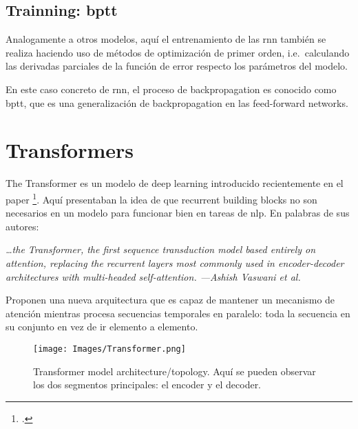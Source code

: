 \subsection{Trainning: \acrlong*{bptt}}

Analogamente a otros modelos, aquí el entrenamiento de las \gls{rnn} también se
realiza haciendo uso de métodos de optimización de primer orden, i.e.\
calculando las derivadas parciales de la función de error respecto los
parámetros del modelo.

En este caso concreto de \gls{rnn}, el proceso de backpropagation es conocido
como \gls{bptt}, que es una generalización de backpropagation en las
feed-forward networks.


\section{Transformers} \label{sec:transformers}

The Transformer es un modelo de deep learning introducido recientemente en el
paper \citetitle{vaswani17:atten_all_you_need}
\footcite{vaswani17:atten_all_you_need}. Aquí presentaban la idea de que
recurrent building blocks no son necesarios en un modelo para funcionar bien en
tareas de \gls{nlp}. En palabras de sus autores:

\begin{quoteBox}
  \itshape
  \ldots the Transformer, the first sequence transduction model based entirely
  on attention, replacing the recurrent layers most commonly used in
  encoder-decoder architectures with multi-headed self-attention.
  \tcblower
  \hfill \upshape
  ---Ashish Vaswani et al.
\end{quoteBox}

Proponen una nueva arquitectura que es capaz de mantener un mecanismo de
atención mientras procesa secuencias temporales en paralelo: toda la secuencia
en su conjunto en vez de ir elemento a elemento.

\begin{figure}[p]
  \centering
  \texttt{[image: Images/Transformer.png]}
  \caption[Transformer model architecture]{Transformer model
    architecture/topology. Aquí se pueden observar los dos segmentos
    principales: el encoder y el decoder.}
  \label{fig:transformer}
\end{figure}


